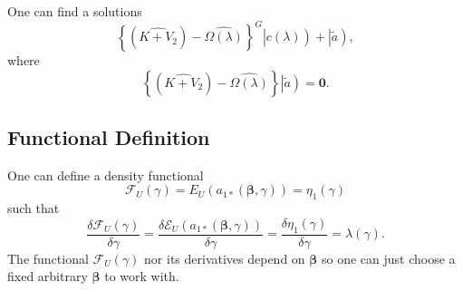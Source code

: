 \documentclass[aps,preprint]{revtex4}%
\begin{document}
One can find a solutions
\begin{equation}
\left\{  \left(  \widehat{K+V_{2}}\right)  -\widehat{\Omega\left(
\lambda\right)  }\right\}  ^{G}\left\vert \overset{}{c\left(  \lambda\right)
}\right)  +\left\vert \overset{}{\tilde{a}}\right)  ,
\end{equation}
where
\begin{equation}
\left\{  \left(  \widehat{K+V_{2}}\right)  -\widehat{\Omega\left(
\lambda\right)  }\right\}  \left\vert \overset{}{\tilde{a}}\right)
=\mathbf{0.}%
\end{equation}


\subsection{Functional Definition}

One can define a density functional
\begin{equation}
\mathcal{F}_{U}\left(  \gamma\right)  =E_{U}\left(  a_{1\ast}\left(
\mathbf{\beta,}\gamma\right)  \right)  =\eta_{1}\left(  \gamma\right)
\end{equation}
such that
\begin{equation}
\frac{\delta\mathcal{F}_{U}\left(  \gamma\right)  }{\delta\gamma}=\frac
{\delta\mathcal{E}_{U}\left(  a_{1\ast}\left(  \mathbf{\beta,}\gamma\right)
\right)  }{\delta\gamma}=\frac{\delta\eta_{1}\left(  \gamma\right)  }%
{\delta\gamma}=\lambda\left(  \gamma\right)  .
\end{equation}
The functional $\mathcal{F}_{U}\left(  \gamma\right)  $ nor its derivatives
depend on $\mathbf{\beta}$ so one can just choose a fixed arbitrary
$\mathbf{\beta}$ to work with.
\end{document}
